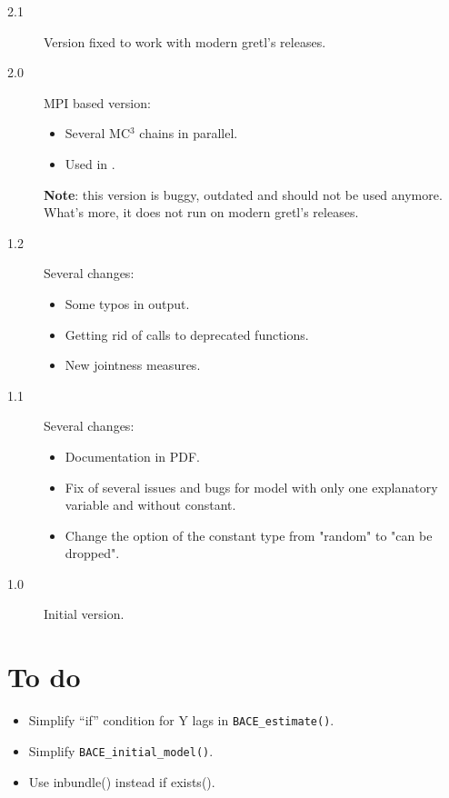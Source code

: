 \documentclass[a4paper]{BACE}
\newcommand{\MCcube}{MC$^3$\xspace}
\begin{document}
\begin{description}
		\item[2.1] Version fixed to work with modern gretl's releases.
		\item[2.0] MPI based version:
			\begin{itemize}[label={--}]
				\item Several \MCcube chains in parallel.
				\item Used in \cite{Kufel_jae_2020,econometrics8020021}.
			\end{itemize}
			\textbf{Note}: this version is buggy, outdated and
			should not be used anymore. What's more, it does not
			run on modern gretl's releases.
		\item[1.2] Several changes:
			\begin{itemize}[label={--}]
				\item Some typos in output.
				\item Getting rid of calls to deprecated functions.
				\item New jointness measures.
			\end{itemize}
		\item[1.1] Several changes:
			\begin{itemize}[label={--}]
				\item Documentation in PDF.
				\item Fix of several issues and bugs for model with only one
				explanatory variable and without constant.
				\item Change the option of the constant type from "random"
					to "can be dropped".
			\end{itemize}
		\item[1.0] Initial version.
	\end{description}

	\section*{To do}
	\begin{itemize}
		\item Simplify ``if'' condition for Y lags in \texttt{BACE\_estimate()}.
		\item Simplify \texttt{BACE\_initial\_model()}.
		\item Use inbundle() instead if exists().
	\end{itemize}
	
	
	
	
	
	
	
	
%	
	
	
	
\end{document}

